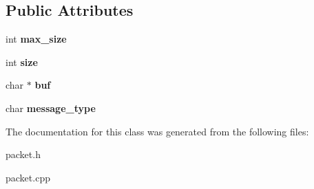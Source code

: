 \subsection*{Public Attributes}
\begin{DoxyCompactItemize}
\item 
\hypertarget{class_write_packet_a4e09d7a56020f0498198559b321b432a}{int {\bfseries max\-\_\-size}}\label{class_write_packet_a4e09d7a56020f0498198559b321b432a}

\item 
\hypertarget{class_write_packet_a5e064b121ff8ae689e3895abc6b6a66e}{int {\bfseries size}}\label{class_write_packet_a5e064b121ff8ae689e3895abc6b6a66e}

\item 
\hypertarget{class_write_packet_ac5ab6aac77c2c1e543c4abb10ab33e2a}{char $\ast$ {\bfseries buf}}\label{class_write_packet_ac5ab6aac77c2c1e543c4abb10ab33e2a}

\item 
\hypertarget{class_write_packet_ad916bc47670dd08982ab44b384396495}{char {\bfseries message\-\_\-type}}\label{class_write_packet_ad916bc47670dd08982ab44b384396495}

\end{DoxyCompactItemize}


The documentation for this class was generated from the following files\-:\begin{DoxyCompactItemize}
\item 
packet.\-h\item 
packet.\-cpp\end{DoxyCompactItemize}
